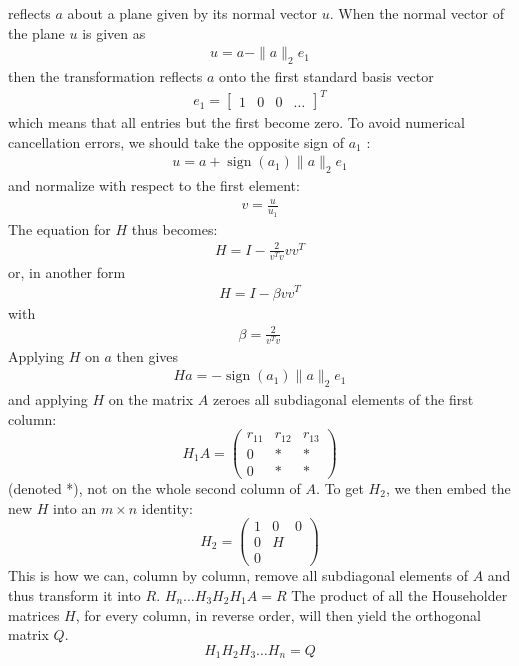 \documentclass[journal,12pt,twocolumn]{IEEEtran}
\begin{document}
reflects $a$ about a plane given by its normal vector $u$. When the normal vector of the plane $u$ is given as
\begin{align*}
    u=a-\|a\|_{2} e_{1}
\end{align*}
then the transformation reflects $a$ onto the first standard basis vector
\begin{align*}
        e_{1}=\left[\begin{array}{llll}
        1 & 0 & 0 & \ldots
    \end{array}\right]^{T}
\end{align*}
which means that all entries but the first become zero. To avoid numerical cancellation errors, we should take the opposite sign of $a_{1}$ :
\begin{align*}
    u=a+\operatorname{sign}\left(a_{1}\right)\|a\|_{2} e_{1}
\end{align*}
and normalize with respect to the first element:
\begin{align*}
   v=\frac{u}{u_{1}} 
\end{align*}
The equation for $H$ thus becomes:
\begin{align*}
    H=I-\frac{2}{v^{T} v} v v^{T}
\end{align*}
or, in another form
\begin{align*}
    H=I-\beta v v^{T}
\end{align*}
with
\begin{align*}
    \beta=\frac{2}{v^{T} v}
\end{align*}
Applying $H$ on $a$ then gives
\begin{align*}
    H a=-\operatorname{sign}\left(a_{1}\right)\|a\|_{2} e_{1}
\end{align*}
and applying $H$ on the matrix $A$ zeroes all subdiagonal elements of the first column:
$$
H_{1} A=\left(\begin{array}{ccc}
r_{11} & r_{12} & r_{13} \\
0 & * & * \\
0 & * & *
\end{array}\right)
$$
(denoted *), not on the whole second column of $A$.
To get $H_{2}$, we then embed the new $H$ into an $m \times n$ identity:
$$
H_{2}=\left(\begin{array}{lll}
1 & 0 & 0 \\
0 & H & \\
0 & &
\end{array}\right)
$$
This is how we can, column by column, remove all subdiagonal elements of $A$ and thus transform it into $R$.
$H_{n} \ldots H_{3} H_{2} H_{1} A=R$
The product of all the Householder matrices $H$, for every column, in reverse order, will then yield the orthogonal matrix $Q$.
$$
H_{1} H_{2} H_{3} \ldots H_{n}=Q
$$
\end{document}
